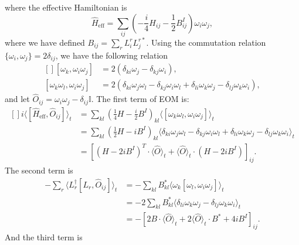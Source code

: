 where the effective Hamiltonian is
\begin{equation}
	\hat H_{\mathrm{eff}} = \sum_{ij} \left(-\frac{i}{4}H_{ij}-\frac{1}{2} B^I_{ij}\right)\omega_i\omega_j,
\end{equation}
where we have defined $B_{ij} = \sum_r L^r_i L^{r*}_j$.
Using the commutation relation $\{\omega_i, \omega_j\} = 2\delta_{ij}$, we have the following relation
\begin{equation}
\begin{aligned}[]
	[\omega_k,\omega_i \omega_j] &= 2(\delta_{ki}\omega_j-\delta_{kj}\omega_i), \\
	[\omega_k \omega_l, \omega_i \omega_j] 
	&= 2(\delta_{ki}\omega_j \omega_l-\delta_{kj} \omega_i \omega_l + \delta_{li}\omega_k \omega_j - \delta_{lj}\omega_k\omega_i),
\end{aligned}
\end{equation}
and let $\hat O_{ij} = \omega_i\omega_j - \delta_{ij}\mathbb I$.
The first term of EOM is:
\begin{equation*}
\begin{aligned}[]
	i\langle[\hat H_{\mathrm{eff}}, \hat O_{ij}]\rangle_t
	&= \sum_{kl}\left(\frac{1}{4}H-\frac{i}{2}B^I \right)_{kl} \langle[\omega_k \omega_l, \omega_i \omega_j]\rangle_t \\
	&= \sum_{kl} \left(\frac{1}{2}H-i B^I\right)_{kl} \langle 
		\delta_{ki}\omega_j \omega_l-\delta_{kj} \omega_i \omega_l + 
		\delta_{li}\omega_k \omega_j - \delta_{lj}\omega_k\omega_i
	\rangle_t \\
	&= \left[
		(H-2iB^I)^T \cdot \langle\hat O\rangle_t + 
		\langle\hat O\rangle_t \cdot (H-2iB^I)
	\right]_{ij}.
\end{aligned}
\end{equation*}
The second term is
\begin{equation*}
\begin{aligned}
	-\sum_r \langle L_r^\dagger[L_r, \hat O_{ij}] \rangle_t
	&= -\sum_{kl} B_{kl}^* \langle \omega_k [\omega_l, \omega_i \omega_j] \rangle_t \\
	&= -2\sum_{kl} B_{kl}^* \langle 
		\delta_{li} \omega_k \omega_j - 
		\delta_{lj} \omega_k \omega_i
	\rangle_t \\
	&= -\left[2B\cdot \langle\hat O\rangle_t + 2\langle\hat O\rangle_t\cdot B^* + 4i B^I \right]_{ij}.
\end{aligned}
\end{equation*}
And the third term is

